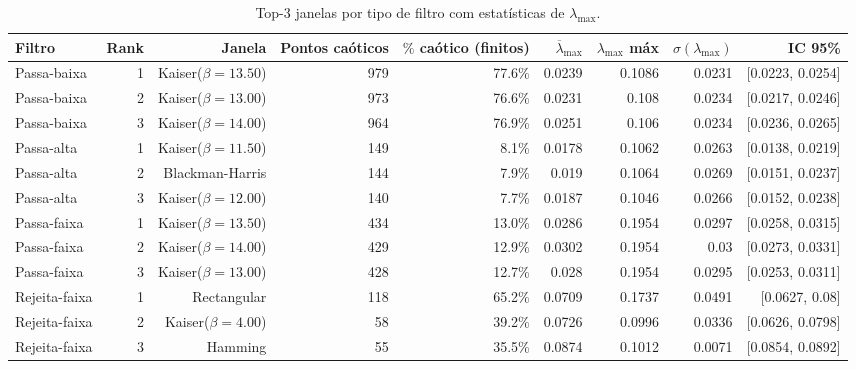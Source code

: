 \begin{table}[htbp]
  \centering
  \caption{Top-3 janelas por tipo de filtro com estatísticas de $\lambda_{\max}$.}
  \begin{tabular}{lrrrrrrrr}
    \toprule
    Filtro & Rank & Janela & Pontos caóticos & $\%$ caótico (finitos) & $\overline{\lambda}_{\max}$ & $\lambda_{\max}$ máx & $\sigma(\lambda_{\max})$ & IC 95\% \\
    \midrule
    Passa-baixa & 1 & Kaiser($\beta=13.50$) & 979 & 77.6\% & 0.0239 & 0.1086 & 0.0231 & [0.0223, 0.0254] \\
    Passa-baixa & 2 & Kaiser($\beta=13.00$) & 973 & 76.6\% & 0.0231 & 0.108 & 0.0234 & [0.0217, 0.0246] \\
    Passa-baixa & 3 & Kaiser($\beta=14.00$) & 964 & 76.9\% & 0.0251 & 0.106 & 0.0234 & [0.0236, 0.0265] \\
    Passa-alta & 1 & Kaiser($\beta=11.50$) & 149 & 8.1\% & 0.0178 & 0.1062 & 0.0263 & [0.0138, 0.0219] \\
    Passa-alta & 2 & Blackman-Harris & 144 & 7.9\% & 0.019 & 0.1064 & 0.0269 & [0.0151, 0.0237] \\
    Passa-alta & 3 & Kaiser($\beta=12.00$) & 140 & 7.7\% & 0.0187 & 0.1046 & 0.0266 & [0.0152, 0.0238] \\
    Passa-faixa & 1 & Kaiser($\beta=13.50$) & 434 & 13.0\% & 0.0286 & 0.1954 & 0.0297 & [0.0258, 0.0315] \\
    Passa-faixa & 2 & Kaiser($\beta=14.00$) & 429 & 12.9\% & 0.0302 & 0.1954 & 0.03 & [0.0273, 0.0331] \\
    Passa-faixa & 3 & Kaiser($\beta=13.00$) & 428 & 12.7\% & 0.028 & 0.1954 & 0.0295 & [0.0253, 0.0311] \\
    Rejeita-faixa & 1 & Rectangular & 118 & 65.2\% & 0.0709 & 0.1737 & 0.0491 & [0.0627, 0.08] \\
    Rejeita-faixa & 2 & Kaiser($\beta=4.00$) & 58 & 39.2\% & 0.0726 & 0.0996 & 0.0336 & [0.0626, 0.0798] \\
    Rejeita-faixa & 3 & Hamming & 55 & 35.5\% & 0.0874 & 0.1012 & 0.0071 & [0.0854, 0.0892] \\
    \bottomrule
  \end{tabular}
\end{table}
